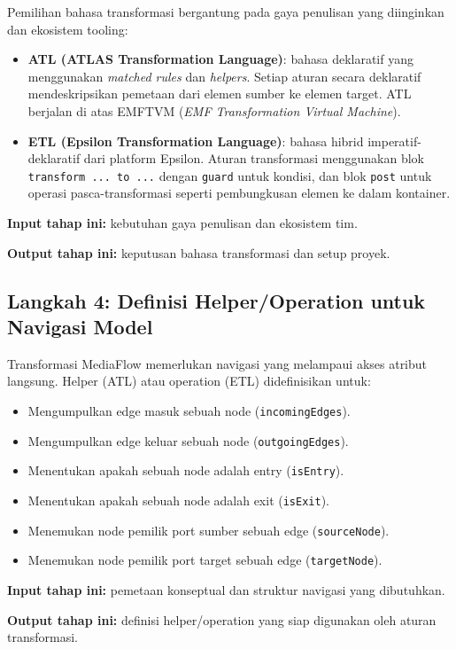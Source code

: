Pemilihan bahasa transformasi bergantung pada gaya penulisan yang diinginkan dan ekosistem tooling:
\begin{itemize}
  \item \textbf{ATL (ATLAS Transformation Language)}: bahasa deklaratif yang menggunakan \textit{matched rules} dan \textit{helpers}. Setiap aturan secara deklaratif mendeskripsikan pemetaan dari elemen sumber ke elemen target. ATL berjalan di atas EMFTVM (\textit{EMF Transformation Virtual Machine}).
  \item \textbf{ETL (Epsilon Transformation Language)}: bahasa hibrid imperatif-deklaratif dari platform Epsilon. Aturan transformasi menggunakan blok \texttt{transform ... to ...} dengan \texttt{guard} untuk kondisi, dan blok \texttt{post} untuk operasi pasca-transformasi seperti pembungkusan elemen ke dalam kontainer.
\end{itemize}

\textbf{Input tahap ini:} kebutuhan gaya penulisan dan ekosistem tim.

\textbf{Output tahap ini:} keputusan bahasa transformasi dan setup proyek.

\subsection[Langkah 4: Definisi Helper/Operation]{Langkah 4: Definisi Helper/Operation untuk Navigasi Model}

Transformasi MediaFlow memerlukan navigasi yang melampaui akses atribut langsung. Helper (ATL) atau operation (ETL) didefinisikan untuk:
\begin{itemize}
  \item Mengumpulkan edge masuk sebuah node (\texttt{incomingEdges}).
  \item Mengumpulkan edge keluar sebuah node (\texttt{outgoingEdges}).
  \item Menentukan apakah sebuah node adalah entry (\texttt{isEntry}).
  \item Menentukan apakah sebuah node adalah exit (\texttt{isExit}).
  \item Menemukan node pemilik port sumber sebuah edge (\texttt{sourceNode}).
  \item Menemukan node pemilik port target sebuah edge (\texttt{targetNode}).
\end{itemize}

\textbf{Input tahap ini:} pemetaan konseptual dan struktur navigasi yang dibutuhkan.

\textbf{Output tahap ini:} definisi helper/operation yang siap digunakan oleh aturan transformasi.


